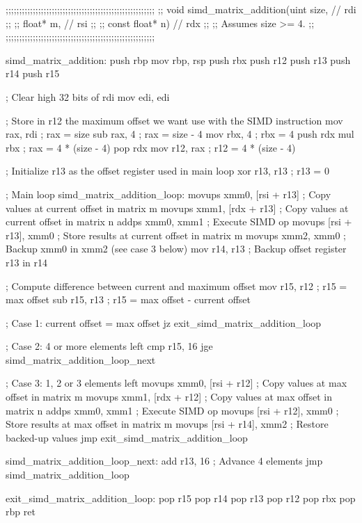 \documentclass[a4paper, 10pt, twoside]{article}
\begin{document}
\begin{code}
  ;;;;;;;;;;;;;;;;;;;;;;;;;;;;;;;;;;;;;;;;;;;;;;;;;;;;;;;
  ;; void simd_matrix_addition(uint size,       // rdi ;;
  ;;                           float* m,        // rsi ;;
  ;;                           const float* n)  // rdx ;;
  ;; Assumes size >= 4.                                ;;
  ;;;;;;;;;;;;;;;;;;;;;;;;;;;;;;;;;;;;;;;;;;;;;;;;;;;;;;;

  simd_matrix_addition:
    push rbp
    mov rbp, rsp
    push rbx
    push r12
    push r13
    push r14
    push r15

    ; Clear high 32 bits of rdi
    mov edi, edi

    ; Store in r12 the maximum offset we want use with the SIMD instruction
    mov rax, rdi              ; rax = size
    sub rax, 4                ; rax = size - 4
    mov rbx, 4                ; rbx = 4
    push rdx
    mul rbx                   ; rax = 4 * (size - 4)
    pop rdx
    mov r12, rax              ; r12 = 4 * (size - 4)

    ; Initialize r13 as the offset register used in main loop
    xor r13, r13              ; r13 = 0

    ; Main loop
  simd_matrix_addition_loop:
    movups xmm0, [rsi + r13]  ; Copy values at current offset in matrix m
    movups xmm1, [rdx + r13]  ; Copy values at current offset in matrix n
    addps xmm0, xmm1          ; Execute SIMD op
    movups [rsi + r13], xmm0  ; Store results at current offset in matrix m
    movups xmm2, xmm0         ; Backup xmm0 in xmm2 (see case 3 below)
    mov r14, r13              ; Backup offset register r13 in r14

    ; Compute difference between current and maximum offset
    mov r15, r12              ; r15 = max offset
    sub r15, r13              ; r15 = max offset - current offset

    ; Case 1: current offset = max offset
    jz exit_simd_matrix_addition_loop

    ; Case 2: 4 or more elements left
    cmp r15, 16
    jge simd_matrix_addition_loop_next

    ; Case 3: 1, 2 or 3 elements left
    movups xmm0, [rsi + r12]  ; Copy values at max offset in matrix m
    movups xmm1, [rdx + r12]  ; Copy values at max offset in matrix n
    addps xmm0, xmm1          ; Execute SIMD op
    movups [rsi + r12], xmm0  ; Store results at max offset in matrix m
    movups [rsi + r14], xmm2  ; Restore backed-up values
    jmp exit_simd_matrix_addition_loop

  simd_matrix_addition_loop_next:
    add r13, 16               ; Advance 4 elements
    jmp simd_matrix_addition_loop

  exit_simd_matrix_addition_loop:
    pop r15
    pop r14
    pop r13
    pop r12
    pop rbx
    pop rbp
    ret
\end{code}
\end{document}
